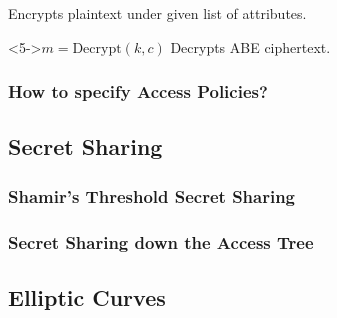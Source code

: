 \begin{frame}[c]
\begin{minipage}[t]{0.49\textwidth}
\begin{block}
            \centering
            Encrypts plaintext under given list of attributes.
        \end{block}
        \vspace{0.5cm}
        \begin{block}<5->{\centering $m = \text{Decrypt}(k, c)$}
            \centering
            Decrypts ABE ciphertext.
        \end{block}
    \end{minipage}
\end{frame}

\begin{frame}[c]
    \frametitle{How to specify Access Policies?}
    
\end{frame}

\subsection{Secret Sharing}
\begin{frame}[c]
    \frametitle{Shamir's Threshold Secret Sharing}
    
\end{frame}

\begin{frame}
    \frametitle{Secret Sharing down the Access Tree}
    
\end{frame}


\subsection{Elliptic Curves}

